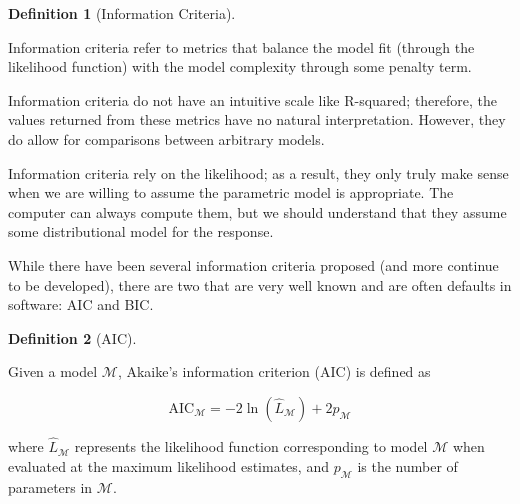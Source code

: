 \documentclass[
  letterpaper,
  DIV=11,
  numbers=noendperiod]{scrreprt}
\theoremstyle{definition}
\newtheorem{definition}{Definition}[chapter]
\theoremstyle{definition}
\theoremstyle{remark}
\begin{document}
\begin{definition}[Information
Criteria]\protect\hypertarget{def-information-criteria}{}\label{def-information-criteria}

Information criteria refer to metrics that balance the model fit
(through the likelihood function) with the model complexity through some
penalty term.

\end{definition}

Information criteria do not have an intuitive scale like R-squared;
therefore, the values returned from these metrics have no natural
interpretation. However, they do allow for comparisons between arbitrary
models.

\begin{tcolorbox}[enhanced jigsaw, left=2mm, toprule=.15mm, arc=.35mm, breakable, opacitybacktitle=0.6, opacityback=0, rightrule=.15mm, colbacktitle=quarto-callout-warning-color!10!white, coltitle=black, leftrule=.75mm, toptitle=1mm, colframe=quarto-callout-warning-color-frame, titlerule=0mm, title=\textcolor{quarto-callout-warning-color}{\faExclamationTriangle}\hspace{0.5em}{Warning}, bottomrule=.15mm, colback=white, bottomtitle=1mm]

Information criteria rely on the likelihood; as a result, they only
truly make sense when we are willing to assume the parametric model is
appropriate. The computer can always compute them, but we should
understand that they assume some distributional model for the response.

\end{tcolorbox}

While there have been several information criteria proposed (and more
continue to be developed), there are two that are very well known and
are often defaults in software: AIC and BIC.

\begin{definition}[AIC]\protect\hypertarget{def-aic}{}\label{def-aic}

Given a model \(\mathcal{M}\), Akaike's information criterion (AIC) is
defined as

\[\text{AIC}_{\mathcal{M}} = -2\ln\left(\widehat{L}_{\mathcal{M}}\right) + 2p_{\mathcal{M}}\]

where \(\widehat{L}_{\mathcal{M}}\) represents the likelihood function
corresponding to model \(\mathcal{M}\) when evaluated at the maximum
likelihood estimates, and \(p_{\mathcal{M}}\) is the number of
parameters in \(\mathcal{M}\).

\end{definition}
\end{document}
